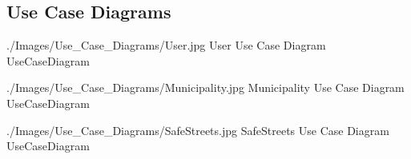 \documentclass[../../../RASD.tex]{subfiles}
\begin{document}
\subsection{Use Case Diagrams\label{sect:3.2.2}}

\image {13cm} {./Images/Use_Case_Diagrams/User.jpg} {User Use Case Diagram} {UseCaseDiagram}

\image {13cm} {./Images/Use_Case_Diagrams/Municipality.jpg} {Municipality Use Case Diagram} {UseCaseDiagram}

\image {13cm} {./Images/Use_Case_Diagrams/SafeStreets.jpg} {SafeStreets Use Case Diagram} {UseCaseDiagram}

\newpage
\end{document}
